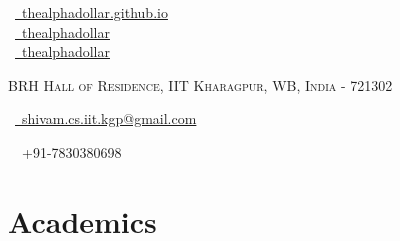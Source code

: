 \documentclass[a4paper,10pt]{extarticle} %
\begin{document}
\pagestyle{empty} %


\begin{multicols}{3}
\normalsize  \faGlobe\ {\href{https://thealphadollar.github.io/}{\  thealphadollar.github.io}}\\
\normalsize \faGithub\ {\href{https://github.com/thealphadollar}{\  thealphadollar}}\\
\normalsize  \faLinkedinSquare\ {\href{https://www.linkedin.com/in/thealphadollar}{\  thealphadollar}}\\
\columnbreak
\normalsize\par{\centering{\huge\textsc{\textcolor{primary}{Shivam Kumar Jha}}}\par} %
\par{\centering\normalsize {\textsc{BRH Hall of Residence, IIT Kharagpur, WB, India - 721302}}\hfill\par}
\columnbreak
\raggedright\hfill\normalsize \faEnvelope\ {\href{mailto:shivam.cs.iit.kgp@gmail.com}{\  shivam.cs.iit.kgp@gmail.com}}\\
\raggedright\hfill{\faPhone\ \  +91-7830380698}
\end{multicols}


\vspace{-0.6cm}
\section{\textcolor{primary}{Academics}}
\end{document}
